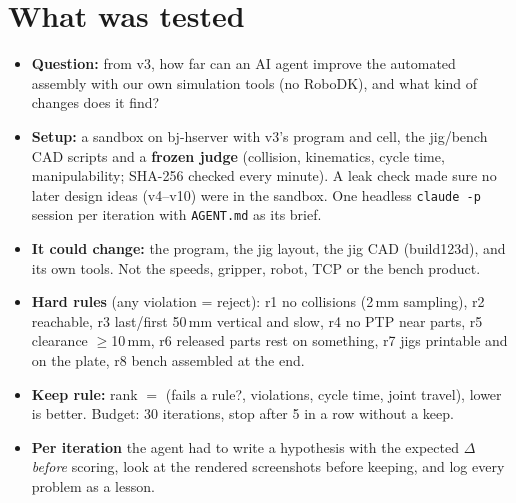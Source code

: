 \section{What was tested}
\begin{itemize}
\item \textbf{Question:} from v3, how far can an AI agent improve the automated assembly with our own simulation tools
  (no RoboDK), and what kind of changes does it find?
\item \textbf{Setup:} a sandbox on bj-hserver with v3's program and cell, the jig/bench CAD scripts and a
  \textbf{frozen judge} (collision, kinematics, cycle time, manipulability; SHA-256 checked every minute). A
  leak check made sure no later design ideas (v4--v10) were in the sandbox. One headless \texttt{claude -p}
  session per iteration with \texttt{AGENT.md} as its brief.
\item \textbf{It could change:} the program, the jig layout, the jig CAD (build123d), and its own tools. Not the
  speeds, gripper, robot, TCP or the bench product.
\item \textbf{Hard rules} (any violation = reject): r1 no collisions (2\,mm sampling), r2 reachable, r3 last/first
  50\,mm vertical and slow, r4 no PTP near parts, r5 clearance $\ge$10\,mm, r6 released parts rest on something,
  r7 jigs printable and on the plate, r8 bench assembled at the end.
\item \textbf{Keep rule:} rank $=$ (fails a rule?, violations, cycle time, joint travel), lower is better.
  Budget: 30 iterations, stop after 5 in a row without a keep.
\item \textbf{Per iteration} the agent had to write a hypothesis with the expected $\Delta$ \emph{before} scoring,
  look at the rendered screenshots before keeping, and log every problem as a lesson.
\end{itemize}


